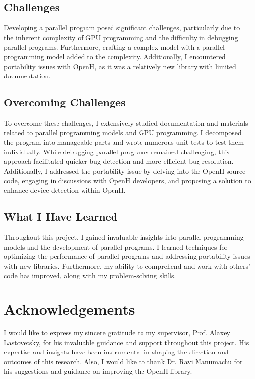 \documentclass[13pt]{article}
\begin{document}
\subsection{Challenges}
Developing a parallel program posed significant challenges, particularly due to the inherent complexity of GPU programming and the difficulty in debugging parallel programs. Furthermore, crafting a complex model with a parallel programming model added to the complexity. Additionally, I encountered portability issues with OpenH, as it was a relatively new library with limited documentation.

\subsection{Overcoming Challenges}
To overcome these challenges, I extensively studied documentation and materials related to parallel programming models and GPU programming. I decomposed the program into manageable parts and wrote numerous unit tests to test them individually. While debugging parallel programs remained challenging, this approach facilitated quicker bug detection and more efficient bug resolution. Additionally, I addressed the portability issue by delving into the OpenH source code, engaging in discussions with OpenH developers, and proposing a solution to enhance device detection within OpenH.

\subsection{What I Have Learned}
Throughout this project, I gained invaluable insights into parallel programming models and the development of parallel programs. I learned techniques for optimizing the performance of parallel programs and addressing portability issues with new libraries. Furthermore, my ability to comprehend and work with others' code has improved, along with my problem-solving skills.

\section{Acknowledgements}
I would like to express my sincere gratitude to my supervisor, Prof. Alaxey Lastovetsky, for his invaluable guidance and support throughout this project. 
His expertise and insights have been instrumental in shaping the direction and outcomes of this research. 
Also, I would like to thank Dr. Ravi Manumachu for his suggestions and guidance on improving the OpenH library. 
\end{document}

